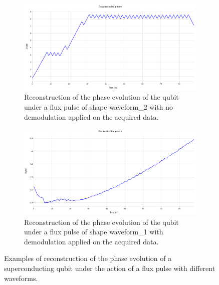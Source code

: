 \begin{figure}[h!]
    \begin{subfigure}[t]{0.45\textwidth}
        \includegraphics[width=\textwidth]{figures/png/Cryoscope/no_demod/long/phase.png}
        \caption{Reconstruction of the phase evolution of the qubit under a flux pulse of shape waveform\_2 with no demodulation applied on the acquired data.}
        \label{fig:no_demodulation:long}
    \end{subfigure}
    \hfill
    \begin{subfigure}[t]{0.45\textwidth}
        \includegraphics[width=\textwidth]{figures/png/Cryoscope/demodulation/long/phase.png}
        \caption{Reconstruction of the phase evolution of the qubit under a flux pulse of shape waveform\_1 with demodulation applied on the acquired data.}
        \label{fig:demodulation:long}
    \end{subfigure}

    \caption{Examples of reconstruction of the phase evolution of a superconducting qubit under the action of a flux pulse with different waveforms.}
    \label{fig:demodulation}
\end{figure}

